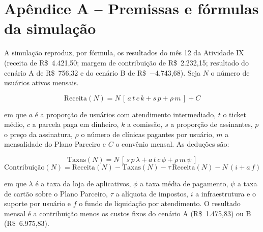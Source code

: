 \section{Apêndice A -- Premissas e fórmulas da simulação}
\label{ap:modelo}

A simulação reproduz, por fórmula, os resultados do mês 12 da Atividade IX (receita de R\$~4.421,50; margem de contribuição de R\$~2.232,15; resultado do cenário A de R\$~756,32 e do cenário B de R\$~$-$4.743,68). Seja $N$ o número de usuários ativos mensais.

\begin{equation}
\text{Receita}(N) = N\,[\,a\,t\,c\,k + s\,p + \rho\,m\,] + C
\end{equation}

em que $a$ é a proporção de usuários com atendimento intermediado, $t$ o ticket médio, $c$ a parcela paga em dinheiro, $k$ a comissão, $s$ a proporção de assinantes, $p$ o preço da assinatura, $\rho$ o número de clínicas pagantes por usuário, $m$ a mensalidade do Plano Parceiro e $C$ o convênio mensal. As deduções são:

\begin{equation}
\text{Taxas}(N) = N\,[\,s\,p\,\lambda + a\,t\,c\,\phi + \rho\,m\,\psi\,]
\end{equation}
\begin{equation}
\text{Contribuição}(N) = \text{Receita}(N) - \text{Taxas}(N) - \tau\,\text{Receita}(N) - N\,(i + a\,f)
\end{equation}

em que $\lambda$ é a taxa da loja de aplicativos, $\phi$ a taxa média de pagamento, $\psi$ a taxa de cartão sobre o Plano Parceiro, $\tau$ a alíquota de impostos, $i$ a infraestrutura e o suporte por usuário e $f$ o fundo de liquidação por atendimento. O resultado mensal é a contribuição menos os custos fixos do cenário A (R\$~1.475,83) ou B (R\$~6.975,83).

